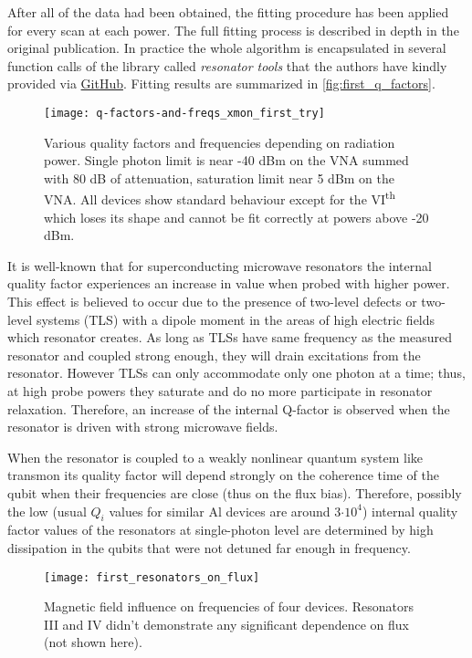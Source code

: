 \documentclass[12pt, twoside]{report}
\numberwithin{equation}{section}
\begin{document}
After all of the data had been obtained, the fitting procedure has been applied for every scan at each power. The full fitting process is described in depth in the original publication\cite{probst2015}. In practice the whole algorithm is encapsulated in several function calls of the library called \textit{resonator tools} that the authors have kindly provided via \href{https://github.com/sebastianprobst/resonatortools}{GitHub}. Fitting results are summarized in \autoref{fig:first_q_factors}.

\begin{figure}[t]
\centering
\texttt{[image: q-factors-and-freqs\_xmon\_first\_try]}
\caption{Various quality factors and frequencies depending on radiation power. Single photon limit is near -40 dBm on the VNA summed with 80 dB of attenuation, saturation limit near 5 dBm on the VNA. All devices show standard behaviour except for the VI\textsuperscript{th} which loses its shape and cannot be fit correctly at powers above -20 dBm.}
\label{fig:first_q_factors}
\end{figure}

It is well-known\cite{wang2009} that for superconducting microwave resonators the internal quality factor experiences an increase in value when probed with higher power. This effect is believed to occur due to the presence of two-level defects or two-level systems (TLS) with a dipole moment in the areas of high electric fields which resonator creates. As long as TLSs have same frequency as the measured resonator and coupled strong enough, they will drain excitations from the resonator. However TLSs can only accommodate only one photon at a time; thus, at high probe powers they saturate and do no more participate in resonator relaxation. Therefore, an increase of the internal Q-factor is observed when the resonator is driven with strong microwave fields.

When the resonator is coupled to a weakly nonlinear quantum system like transmon its quality factor will depend strongly on the coherence time of the qubit when their frequencies are close (thus on the flux bias). Therefore, possibly the low (usual $Q_i$ values for similar Al devices are around 3$\cdot 10^4$) internal quality factor values of the resonators at single-photon level are determined by high dissipation in the qubits that were not detuned far enough in frequency.

\begin{figure}
\centering
\texttt{[image: first\_resonators\_on\_flux]}
\caption{Magnetic field influence on frequencies of four devices. Resonators III and IV didn't demonstrate any significant dependence on flux (not shown here).}
\label{fig:first_resonators_on_flux}
\end{figure} 
\end{document}

